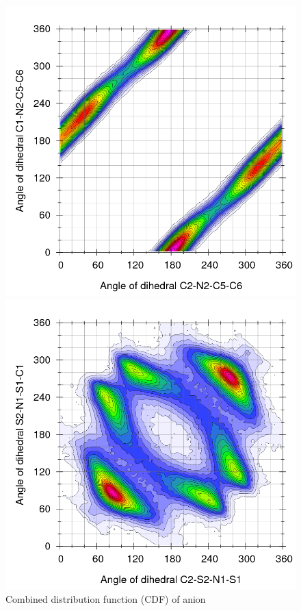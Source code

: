 \documentclass[3p,twocolumn]{elsarticle}
\begin{document}
\begin{figure}[H]
\centering
  \includegraphics[width=\linewidth]{Ludwig.png}%

  \includegraphics[width=\linewidth]{Ludwig_anion.png}%
\caption{Combined distribution function (CDF) of anion}
\label{fig:die_ntf2}
\end{figure}
\end{document}
